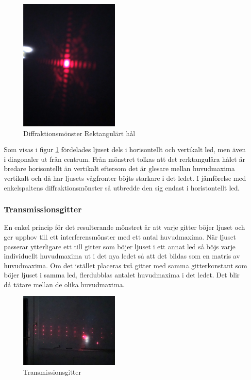 \documentclass[conference]{IEEEtran}
\begin{document}
\begin{figure}[h]
    \begin{center}
        \includegraphics[width = 5cm]{Diffraktion.jpg}
    \end{center}
    \caption{Diffraktionsmönster Rektangulärt hål}
    \label{Rektangel}
\end{figure}

Som visas i figur \ref{Rektangel} fördelades ljuset dels i horisontellt och vertikalt led, men även i diagonaler ut från centrum. Från mönstret tolkas att det rerktangulära hålet är bredare horisontellt än vertikalt eftersom det är glesare mellan huvudmaxima vertikalt och då har ljusets vågfronter böjts starkare i det ledet. I jämförelse med enkelspaltens diffraktionsmönster så utbredde den sig endast i horistontellt led.

\subsubsection{Transmissionsgitter}
En enkel princip för det resulterande mönstret är att varje gitter böjer ljuset och ger upphov till ett interferensmönster med ett antal huvudmaxima. När ljuset passerar ytterligare ett till gitter som böjer ljuset i ett annat led så böjs varje individuellt huvudmaxima ut i det nya ledet så att det  bildas som en matris av huvudmaxima. Om det istället placeras två gitter med samma gitterkonstant som böjer ljuset i samma led, flerdubblas antalet huvudmaxima i det ledet. Det blir då tätare mellan de olika huvudmaxima. 

\begin{figure}[h]
    \begin{center}
        \includegraphics[width = 5cm]{gitter.jpg}
    \end{center}
    \caption{Transmissionsgitter}
    \label{Gitter}
\end{figure}
\end{document}
